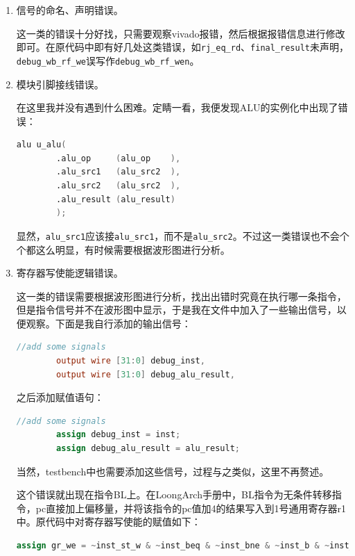 \documentclass[UTF8]{article}
\begin{document}
\begin{enumerate}
    \item 信号的命名、声明错误。
    
    这一类的错误十分好找，只需要观察vivado报错，然后根据报错信息进行修改即可。在原代码中即有好几处这类错误，如\texttt{rj\_eq\_rd}、\texttt{final\_result}未声明，\texttt{debug\_wb\_rf\_we}误写作\texttt{debug\_wb\_rf\_wen}。

    \item 模块引脚接线错误。
    
    在这里我并没有遇到什么困难。定睛一看，我便发现ALU的实例化中出现了错误：

    \begin{lstlisting}[language=Verilog]
        alu u_alu(
        .alu_op     (alu_op    ),
        .alu_src1   (alu_src2  ),
        .alu_src2   (alu_src2  ),
        .alu_result (alu_result)
        );
    \end{lstlisting}

    显然，\texttt{alu\_src1}应该接\texttt{alu\_src1}，而不是\texttt{alu\_src2}。不过这一类错误也不会个个都这么明显，有时候需要根据波形图进行分析。

    \item 寄存器写使能逻辑错误。
    
    这一类的错误需要根据波形图进行分析，找出出错时究竟在执行哪一条指令，但是指令信号并不在波形图中显示，于是我在文件中加入了一些输出信号，以便观察。下面是我自行添加的输出信号：

    \begin{lstlisting}[language=Verilog]
        //add some signals
        output wire [31:0] debug_inst,
        output wire [31:0] debug_alu_result,
    \end{lstlisting}

    之后添加赋值语句：

    \begin{lstlisting}[language=Verilog]
        //add some signals
        assign debug_inst = inst;
        assign debug_alu_result = alu_result;
    \end{lstlisting}

    当然，testbench中也需要添加这些信号，过程与之类似，这里不再赘述。

    这个错误就出现在指令BL上。在LoongArch手册中，BL指令为无条件转移指令，pc直接加上偏移量，并将该指令的pc值加4的结果写入到1号通用寄存器r1中。原代码中对寄存器写使能的赋值如下：

    \begin{lstlisting}[language=Verilog]
        assign gr_we = ~inst_st_w & ~inst_beq & ~inst_bne & ~inst_b & ~inst_bl;
    \end{lstlisting}


\end{enumerate}
\end{document}
